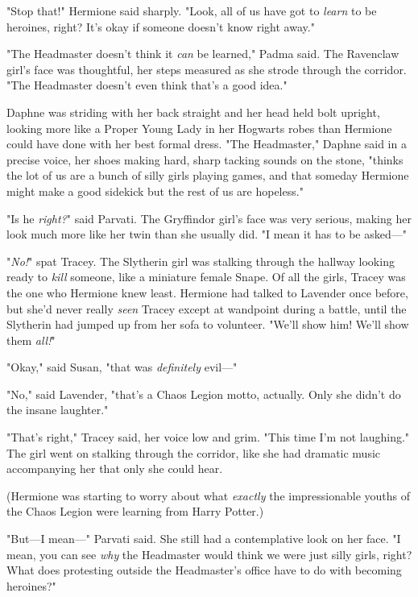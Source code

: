 "Stop that!" Hermione said sharply. "Look, all of us have got to \emph{learn} 
to be heroines, right? It's okay if someone doesn't know right away."

"The Headmaster doesn't think it \emph{can} be learned," Padma said. The 
Ravenclaw girl's face was thoughtful, her steps measured as she strode through 
the corridor. "The Headmaster doesn't even think that's a good idea."

Daphne was striding with her back straight and her head held bolt upright, 
looking more like a Proper Young Lady in her Hogwarts robes than Hermione could 
have done with her best formal dress. "The Headmaster," Daphne said in a 
precise voice, her shoes making hard, sharp tacking sounds on the stone, 
"thinks the lot of us are a bunch of silly girls playing games, and that 
someday Hermione might make a good sidekick but the rest of us are hopeless."

"Is he \emph{right?}" said Parvati. The Gryffindor girl's face was very 
serious, making her look much more like her twin than she usually did. "I mean 
it has to be asked---"

"\emph{No!}" spat Tracey. The Slytherin girl was stalking through the hallway 
looking ready to \emph{kill} someone, like a miniature female Snape. Of all the 
girls, Tracey was the one who Hermione knew least. Hermione had talked to 
Lavender once before, but she'd never really \emph{seen} Tracey except at 
wandpoint during a battle, until the Slytherin had jumped up from her sofa to 
volunteer. "We'll show him! We'll show them \emph{all!}"

"Okay," said Susan, "that was \emph{definitely} evil---"

"No," said Lavender, "that's a Chaos Legion motto, actually. Only she didn't do 
the insane laughter."

"That's right," Tracey said, her voice low and grim. "This time I'm not 
laughing." The girl went on stalking through the corridor, like she had 
dramatic music accompanying her that only she could hear.

(Hermione was starting to worry about what \emph{exactly} the impressionable 
youths of the Chaos Legion were learning from Harry Potter.)

"But---I mean---" Parvati said. She still had a contemplative look on her face. 
"I mean, you can see \emph{why} the Headmaster would think we were just silly 
girls, right? What does protesting outside the Headmaster's office have to do 
with becoming heroines?"

